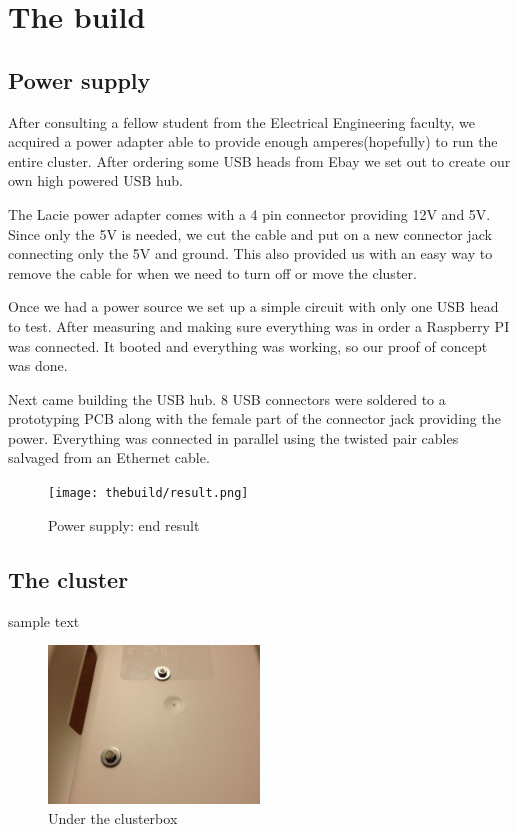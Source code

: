 \clearpage
\section{The build}
\subsection{Power supply}
After consulting a fellow student from the Electrical Engineering faculty, we acquired a power adapter able to provide enough amperes(hopefully) to run the entire cluster. After ordering some USB heads from Ebay we set out to create our own high powered USB hub. 

The Lacie power adapter comes with a 4 pin connector providing 12V and 5V. Since only the 5V is needed, we cut the cable and put on a new connector jack connecting only the 5V and ground. This also provided us with an easy way to remove the cable for when we need to turn off or move the cluster. 

Once we had a power source we set up a simple circuit with only one USB head to test. After measuring and making sure everything was in order a Raspberry PI was connected. It booted and everything was working, so our proof of concept was done.  

Next came building the USB hub. 8 USB connectors were soldered to a prototyping PCB along with the female part of the connector jack providing the power. Everything was connected in parallel using the twisted pair cables salvaged from an Ethernet cable.  

\begin{figure}[h]
	\centering
    \texttt{[image: thebuild/result.png]}
    \caption{Power supply: end result}
    \label{fig:build_power_supply}
\end{figure}

\subsection{The cluster}
sample text

\begin{figure}[h]
	\centering
    \includegraphics[width=0.5\textwidth]{thebuild/cluster_under.jpg}
    \caption{Under the clusterbox}
    \label{fig:build_cluster_under}
\end{figure}

